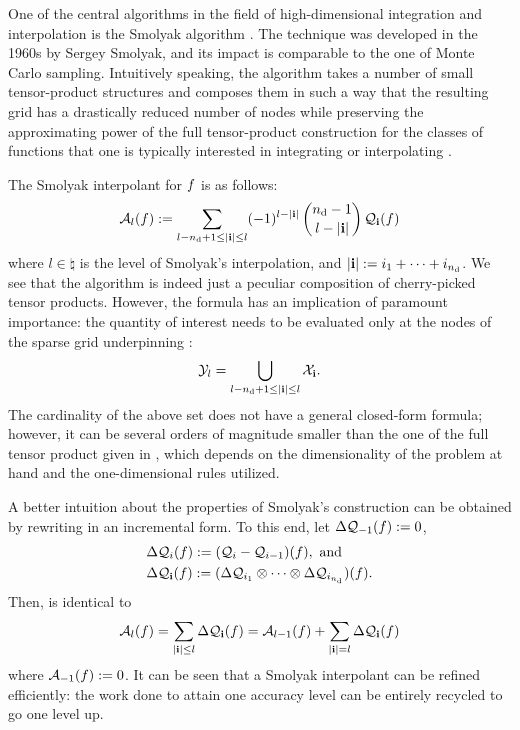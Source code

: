 One of the central algorithms in the field of high-dimensional integration and
interpolation is the Smolyak algorithm \cite{smolyak1963}. The technique was
developed in the 1960s by Sergey Smolyak, and its impact is comparable to the
one of Monte Carlo sampling. Intuitively speaking, the algorithm takes a number
of small tensor-product structures and composes them in such a way that the
resulting grid has a drastically reduced number of nodes while preserving the
approximating power of the full tensor-product construction for the classes of
functions that one is typically interested in integrating or interpolating
\cite{klimke2006}.

The Smolyak interpolant for $f$ is as follows:
\begin{equation} \elab{smolyak}
  \smolyak{l}(\f) := \sum_{l - \nin + 1 \leq |\vi| \leq l} (-1)^{l - |\vi|} \, {\nin - 1 \choose l - |\vi|} \, \tensor{\vi}(\f)
\end{equation}
where $l \in \natural$ is the level of Smolyak's interpolation, and $|\mathbf{i}| :=
i_1 + \dots + i_{n_\text{d}}$. We see that the algorithm is indeed just a peculiar
composition of cherry-picked tensor products. However, the formula has an
implication of paramount importance: the quantity of interest needs to be
evaluated only at the nodes of the sparse grid underpinning :
\begin{equation} \elab{smolyak-grid}
  \Y_l = \bigcup_{l - \nin + 1 \leq |\vi| \leq l} \X_\vi.
\end{equation}
The cardinality of the above set does not have a general closed-form formula;
however, it can be several orders of magnitude smaller than the one of the full
tensor product given in , which depends on the
dimensionality of the problem at hand and the one-dimensional rules utilized.

A better intuition about the properties of Smolyak's construction can be
obtained by rewriting  in an incremental form. To this end, let
$\Delta\mathcal{Q}_{-1}(f) := 0$,
\begin{align}
  & \Delta\tensor{i}(\f) := (\tensor{i} - \tensor{i - 1})(\f), \text{ and} \elab{tensor-delta-1d} \\
  & \Delta\tensor{\vi}(\f) := (\Delta\tensor{i_1} \otimes \cdots \otimes
  \Delta\tensor{i_\nin})(\f). \nonumber
\end{align}
Then,  is identical to
\begin{equation} \elab{smolyak-incremental}
  \smolyak{l}(\f) = \sum_{|\vi| \leq l} \Delta\tensor{\vi}(\f) = \smolyak{l - 1}(\f) + \sum_{|\vi| = l} \Delta\tensor{\vi}(\f)
\end{equation}
where $\mathcal{A}_{-1}(f) := 0$. It can be seen that a Smolyak interpolant can be
refined efficiently: the work done to attain one accuracy level can be entirely
recycled to go one level up.

